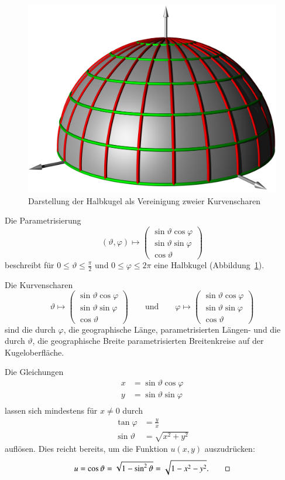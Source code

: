 \begin{beispiel}
\begin{figure}
\centering
\includegraphics[width=0.8\hsize]{../common/3d/kugel.jpg}
\caption{Darstellung der Halbkugel als Vereinigung zweier Kurvenscharen
\label{quasilinear:kugel}}
\end{figure}
Die Parametrisierung
\[
(\vartheta,\varphi)\mapsto
\begin{pmatrix}
\sin\vartheta\cos\varphi\\
\sin\vartheta\sin\varphi\\
\cos\vartheta
\end{pmatrix}
\]
beschreibt für $0\le \vartheta\le \frac{\pi}2$
und $0\le\varphi\le 2\pi$ eine Halbkugel (Abbildung~\ref{quasilinear:kugel}).

Die Kurvenscharen
\[
\vartheta\mapsto
\begin{pmatrix}
\sin\vartheta\cos\varphi\\
\sin\vartheta\sin\varphi\\
\cos\vartheta
\end{pmatrix}
\qquad
\text{und}
\qquad
\varphi\mapsto
\begin{pmatrix}
\sin\vartheta\cos\varphi\\
\sin\vartheta\sin\varphi\\
\cos\vartheta
\end{pmatrix}
\]
sind die durch $\varphi$, die geographische Länge, parametrisierten
Längen- und die durch $\vartheta$, die geographische Breite
parametrisierten Breitenkreise auf der Kugeloberfläche.

Die Gleichungen
\begin{align*}
x&=\sin\vartheta\cos\varphi\\
y&=\sin\vartheta\sin\varphi\\
\end{align*}
lassen sich mindestens für $x\ne 0$ durch
\begin{align*}
\tan\varphi&=\frac{y}{x}\\
\sin\vartheta &=\sqrt{x^2+y^2}
\end{align*}
auflösen. Dies reicht bereits, um die Funktion $u(x,y)$
auszudrücken:
\[
u=\cos\vartheta=\sqrt{1-\sin^2\vartheta}=\sqrt{1-x^2-y^2}.
\qedhere
\]
\end{beispiel}

